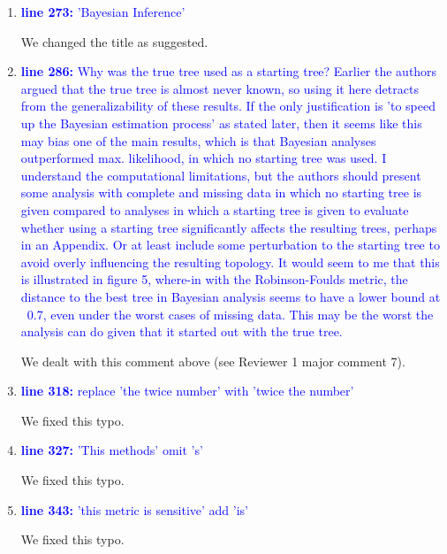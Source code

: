 \documentclass[12pt,letterpaper]{article}
\begin{document}
\begin{enumerate}
\item{\textcolor{blue}{\textbf{line 273:} 'Bayesian Inference'}}

We changed the title as suggested.

\item{\textcolor{blue}{\textbf{line 286:} Why was the true tree used as a starting tree? Earlier the authors argued that the true tree is almost never known, so using it here detracts from the generalizability of these results. If the only justification is 'to speed up the Bayesian estimation process' as stated later, then it seems like this may bias one of the main results, which is that Bayesian analyses outperformed max. likelihood, in which no starting tree was used. I understand the computational limitations, but the authors should present some analysis with complete and missing data in which no starting tree is given compared to analyses in which a starting tree is given to evaluate whether using a starting tree significantly affects the resulting trees, perhaps in an Appendix. Or at least include some perturbation to the starting tree to avoid overly influencing the resulting topology. It would seem to me that this is illustrated in figure 5, where-in with the Robinson-Foulds metric, the distance to the best tree in Bayesian analysis seems to have a lower bound at ~0.7, even under the worst cases of missing data. This may be the worst the analysis can do given that it started out with the true tree. }}

We dealt with this comment above (see Reviewer 1 major comment 7).

\item{\textcolor{blue}{\textbf{line 318:} replace 'the twice number' with 'twice the number'}}

We fixed this typo.

\item{\textcolor{blue}{\textbf{line 327:} 'This methods' omit 's'}}

We fixed this typo.

\item{\textcolor{blue}{\textbf{line 343:} 'this metric is sensitive' add 'is'}}

We fixed this typo.


\end{enumerate}
\end{document}
